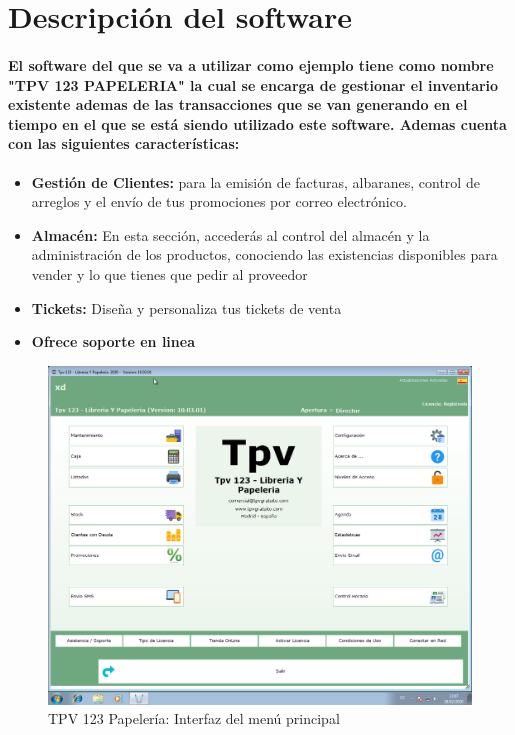 \documentclass[12pt,a4paper]{article}
\begin{document}
\section{Descripción del software}
\paragraph{El software del que se va a utilizar como ejemplo tiene como nombre "TPV 123 PAPELERIA" la cual se encarga de gestionar el inventario existente ademas de las transacciones que se van generando en el tiempo en el que se está siendo utilizado este software. Ademas cuenta con las siguientes características:}
\begin{itemize}
\item \textbf{Gestión de Clientes: }para la emisión de facturas, albaranes, control de arreglos y el envío de tus promociones por correo electrónico.
\item \textbf{Almacén: }En esta sección, accederás al control del almacén y la administración de los productos, conociendo las existencias disponibles para vender y lo que tienes que pedir al proveedor
\item \textbf{Tickets: }Diseña y personaliza tus tickets de venta
\item \textbf{Ofrece soporte en linea}
\end{itemize}

\begin{figure}[hbtp]
\caption{TPV 123 Papelería: Interfaz del menú principal}
\centering
\includegraphics[scale=0.35]{tpv.png}
\end{figure}
\newpage
\end{document}

